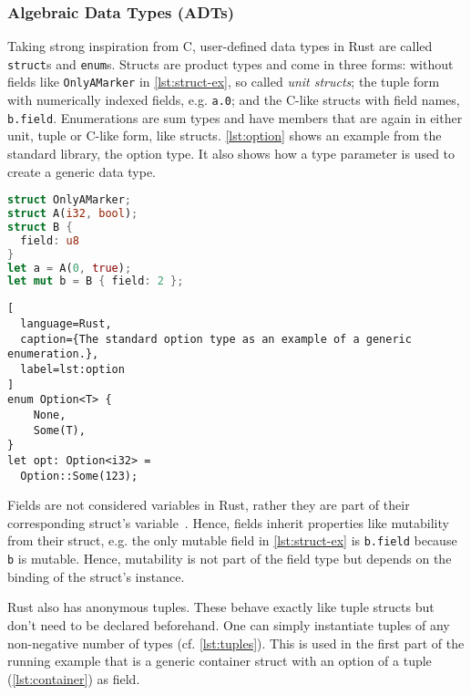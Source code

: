 \subsubsection{Algebraic Data Types (ADTs)}

Taking strong inspiration from C, user-defined data types in Rust are called
\lstinline!struct!s and \lstinline!enum!s. Structs are product types and come in
three forms: without fields like \lstinline!OnlyAMarker! in
\autoref{lst:struct-ex}, so called \emph{unit structs}; the tuple form with
numerically indexed fields, e.g. \lstinline!a.0!; and the C-like structs with
field names, \lstinline!b.field!. Enumerations are sum types and have members
that are again in either unit, tuple or C-like form, like structs.
\autoref{lst:option} shows  an example from the standard library, the option
type. It also shows how a type parameter is used to create a generic data type.

\noindent\begin{minipage}[t]{.45\textwidth}
\begin{lstlisting}[language=Rust, caption={All three types of structs.}, label=lst:struct-ex]
struct OnlyAMarker;
struct A(i32, bool);
struct B {
  field: u8
}
let a = A(0, true);
let mut b = B { field: 2 };
\end{lstlisting}
\end{minipage}\hfill
\begin{minipage}[t]{.45\textwidth}
\begin{lstlisting}[
  language=Rust,
  caption={The standard option type as an example of a generic enumeration.},
  label=lst:option
]
enum Option<T> {
    None,
    Some(T),
}
let opt: Option<i32> =
  Option::Some(123);
\end{lstlisting}
\end{minipage}

Fields are not considered variables in Rust, rather they are part of their
corresponding struct's variable~\cite{rustref}. Hence, fields inherit properties
like mutability from their struct, e.g. the only mutable field in
\autoref{lst:struct-ex} is \lstinline!b.field! because \lstinline!b! is mutable.
Hence, mutability is not part of the field type but depends on the binding of
the struct's instance.

Rust also has anonymous tuples. These behave exactly like tuple structs but
don't need to be declared beforehand. One can simply instantiate tuples of any
non-negative number of types (cf. \autoref{lst:tuples}). This is used in the
first part of the running example that is a generic container struct with an
option of a tuple (\autoref{lst:container}) as field.

